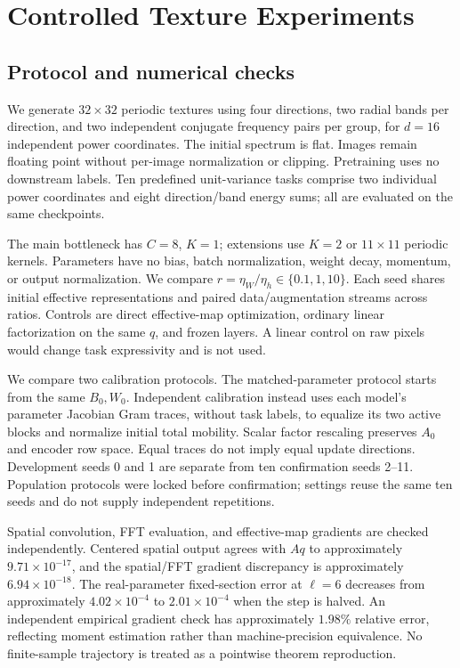 \section{Controlled Texture Experiments}
\label{sec:textures}
\subsection{Protocol and numerical checks}
We generate $32\times32$ periodic textures using four directions, two radial bands per direction, and two independent conjugate frequency pairs per group, for $d=16$ independent power coordinates. The initial spectrum is flat. Images remain floating point without per-image normalization or clipping. Pretraining uses no downstream labels. Ten predefined unit-variance tasks comprise two individual power coordinates and eight direction/band energy sums; all are evaluated on the same checkpoints.

The main bottleneck has $C=8$, $K=1$; extensions use $K=2$ or $11\times11$ periodic kernels. Parameters have no bias, batch normalization, weight decay, momentum, or output normalization. We compare $r=\eta_W/\eta_h\in\{0.1,1,10\}$. Each seed shares initial effective representations and paired data/augmentation streams across ratios. Controls are direct effective-map optimization, ordinary linear factorization on the same $q$, and frozen layers. A linear control on raw pixels would change task expressivity and is not used.

We compare two calibration protocols. The matched-parameter protocol starts from the same $B_0,W_0$. Independent calibration instead uses each model's parameter Jacobian Gram traces, without task labels, to equalize its two active blocks and normalize initial total mobility. Scalar factor rescaling preserves $A_0$ and encoder row space. Equal traces do not imply equal update directions. Development seeds 0 and 1 are separate from ten confirmation seeds 2--11. Population protocols were locked before confirmation; settings reuse the same ten seeds and do not supply independent repetitions.

Spatial convolution, FFT evaluation, and effective-map gradients are checked independently. Centered spatial output agrees with $Aq$ to approximately $9.71\times10^{-17}$, and the spatial/FFT gradient discrepancy is approximately $6.94\times10^{-18}$. The real-parameter fixed-section error at $\ell=6$ decreases from approximately $4.02\times10^{-4}$ to $2.01\times10^{-4}$ when the step is halved. An independent empirical gradient check has approximately $1.98\%$ relative error, reflecting moment estimation rather than machine-precision equivalence. No finite-sample trajectory is treated as a pointwise theorem reproduction.


